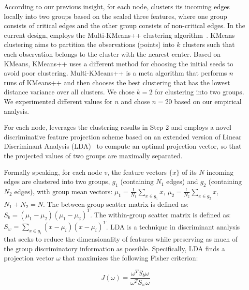According to our previous insight, for each node, \tool clusters its incoming edges locally into two groups based on the scaled three features, where one group consists of critical edges and the other group consists of non-critical edges.
In the current design, \tool employs the Multi-KMeans++ clustering algorithm~\cite{Arthur:2007:KAC:1283383.1283494}. 
KMeans clustering aims to partition the observations (points) into $k$ clusters such that each observation belongs to the cluster with the nearest center. 
Based on KMeans, KMeans++ uses a different method for choosing the initial seeds to avoid poor clustering.
Multi-KMeans++ is a meta algorithm that performs $n$ runs of KMeans++ and then chooses the best clustering that has the lowest distance variance over all clusters.
We chose $k=2$ for clustering into two groups.
We experimented different values for $n$ and chose $n=20$ based on our empirical analysis. 




For each node, \tool leverages the clustering results in Step 2 and employs a novel discriminative feature projection scheme based on an extended version of Linear Discriminant Analysis (LDA)~\cite{Mika99fisherdiscriminant} to compute an optimal projection vector, so that the projected values of two groups are maximally separated.

Formally speaking, for each node $v$, the feature vectors $\{x\}$ of its $N$ incoming edges are clustered into two groups, $g_1$ (containing $N_1$ edges) and $g_2$ (containing $N_2$ edges), with group mean vectors: $\mu_1 = \frac{1}{N_1}\sum_{x \in g_1} x$, $\mu_2 = \frac{1}{N_2}\sum_{x\in g_2} x$, $N_1 + N_2 = N$.
The between-group scatter matrix is defined as: $S_b = (\mu_1 - \mu_2)(\mu_1 - \mu_2)^T$.
The within-group scatter matrix is defined as: $S_w = \sum_{x\in g_i}(x-\mu_i)(x-\mu_i)^T$.
LDA is a technique in discriminant analysis~\cite{friedman2001elements} that seeks to reduce the dimensionality of features while preserving as much of the group discriminatory information as possible. Specifically, LDA finds a projection vector $\omega$ that maximizes the following Fisher criterion:

\vspace*{-2ex}
\begin{equation}
    \label{eq:lda-objective}
    J(\omega) = \frac{\omega^TS_b\omega}{\omega^TS_w\omega}
\end{equation}

